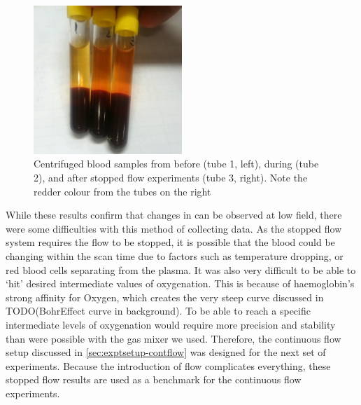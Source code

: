 \begin{figure}[t]
\centering
\includegraphics[width=0.5\textwidth]{figures/stoppedflow/samplecheck.jpg}
\caption[Centrifuged blood samples from start and end of experiment]{Centrifuged blood samples from before (tube 1, left), during (tube 2), and after stopped flow experiments (tube 3, right). Note the redder colour from the tubes on the right}
\label{fig:sf-bloodbeforeafter}
\end{figure}

While these results confirm that changes in \SOtwo can be observed at low field, there were some difficulties with this method of collecting data.
As the stopped flow system requires the flow to be stopped, it is possible that the blood could be changing within the scan time due to factors such as temperature dropping, or red blood cells separating from the plasma.
It was also very difficult to be able to `hit' desired intermediate values of oxygenation.
This is because of haemoglobin's strong affinity for Oxygen, which creates the very steep curve discussed in TODO(BohrEffect curve in background).
To be able to reach a specific intermediate levels of oxygenation would require more precision and stability than were possible with the gas mixer we used.
Therefore, the continuous flow setup discussed in \autoref{sec:exptsetup-contflow} was designed for the next set of experiments.
Because the introduction of flow complicates everything, these stopped flow results are used as a benchmark for the continuous flow experiments.
